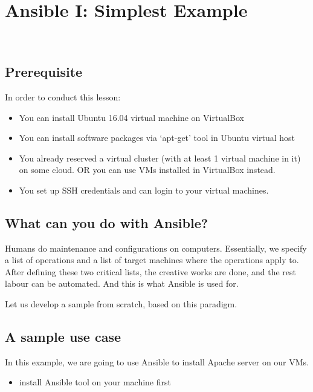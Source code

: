 \section{Ansible I: Simplest Example}\label{ansible-i-simplest-example}

\FILENAME\

\subsection{Prerequisite}\label{prerequisite}

In order to conduct this lesson:

\begin{itemize}
\item
  You can install Ubuntu 16.04 virtual machine on VirtualBox
\item
  You can install software packages via `apt-get' tool in Ubuntu virtual
  host
\item
  You already reserved a virtual cluster (with at least 1 virtual
  machine in it) on some cloud. OR you can use VMs installed in
  VirtualBox instead.
\item
  You set up SSH credentials and can login to your virtual machines.
\end{itemize}

\subsection{What can you do with
Ansible?}\label{what-can-you-do-with-ansible}

Humans do maintenance and configurations on computers. Essentially, we
specify a list of operations and a list of target machines where the
operations apply to. After defining these two critical lists, the
creative works are done, and the rest labour can be automated. And this
is what Ansible is used for.

Let us develop a sample from scratch, based on this paradigm.

\subsection{A sample use case}\label{a-sample-use-case}

In this example, we are going to use Ansible to install Apache server on
our VMs.

\begin{itemize}

\item
  install Ansible tool on your machine first
\end{itemize}

